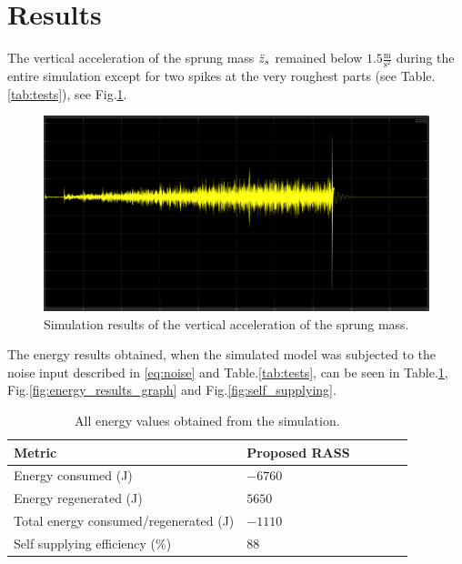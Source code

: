 \section{Results}
The vertical acceleration of the sprung mass $\Ddot{z}_s$ remained below $1.5\frac{\text{m}}{\text{s}^2}$ during the entire simulation except for two spikes at the very roughest parts (see Table.\:\ref{tab:tests}), see Fig.\:\ref{fig:vertical_acceleration}.
\begin{figure}
    \centering
    \includegraphics[width=\columnwidth]{images/vertical_acceleration.png}
    \caption{Simulation results of the vertical acceleration of the sprung mass.}
    \label{fig:vertical_acceleration}
\end{figure}

The energy results obtained, when the simulated model was subjected to the noise input described in \eqref{eq:noise} and Table.\:\ref{tab:tests}, can be seen in Table.\:\ref{tab:results_energy}, Fig.\:\ref{fig:energy_results_graph} and Fig.\:\ref{fig:self_supplying}.
\begin{table}[ht]
	\centering
	\begin{tabular}{|l|l|l|l|l|l|}
			\hline
			Metric                                            & Proposed RASS        \\
			\hline
			Energy consumed (J)                               & $-6760$               \\
			Energy regenerated (J)                            & $5650$               \\
			Total energy consumed/regenerated (J)             & $-1110$               \\
            Self supplying efficiency (\%)                    & $88$             \\
			\hline
		\end{tabular}
	\caption{All energy values obtained from the simulation.}
	\label{tab:results_energy}
\end{table}

